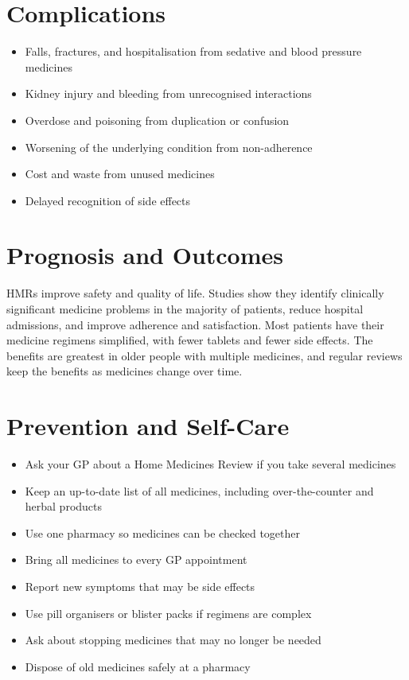 \section*{Complications}
\begin{itemize}
    \item Falls, fractures, and hospitalisation from sedative and blood pressure medicines
    \item Kidney injury and bleeding from unrecognised interactions
    \item Overdose and poisoning from duplication or confusion
    \item Worsening of the underlying condition from non-adherence
    \item Cost and waste from unused medicines
    \item Delayed recognition of side effects
\end{itemize}

\section*{Prognosis and Outcomes}
HMRs improve safety and quality of life. Studies show they identify clinically significant medicine problems in the majority of patients, reduce hospital admissions, and improve adherence and satisfaction. Most patients have their medicine regimens simplified, with fewer tablets and fewer side effects. The benefits are greatest in older people with multiple medicines, and regular reviews keep the benefits as medicines change over time.

\section*{Prevention and Self-Care}
\begin{itemize}
    \item Ask your GP about a Home Medicines Review if you take several medicines
    \item Keep an up-to-date list of all medicines, including over-the-counter and herbal products
    \item Use one pharmacy so medicines can be checked together
    \item Bring all medicines to every GP appointment
    \item Report new symptoms that may be side effects
    \item Use pill organisers or blister packs if regimens are complex
    \item Ask about stopping medicines that may no longer be needed
    \item Dispose of old medicines safely at a pharmacy
\end{itemize}

